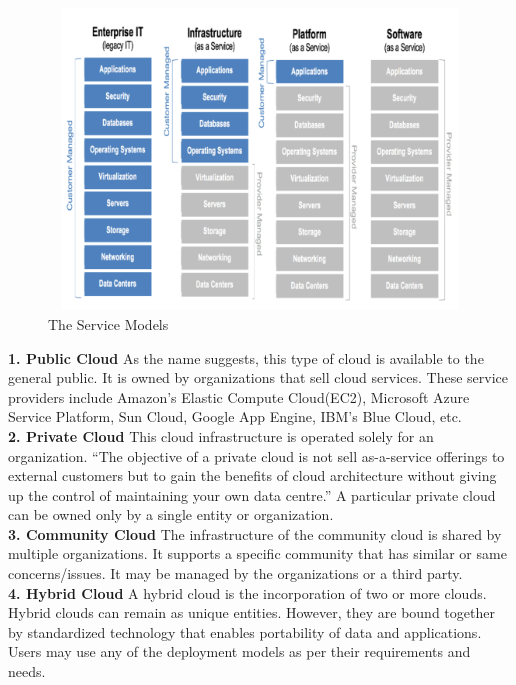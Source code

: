 \begin{figure}[htb]
\centering
\includegraphics[width=12cm,height=8cm]{5-contents/1-Introduction/images/service-model.png} %
\caption{The Service Models}
\label{fig:label} %
\end{figure}

\textbf{1. Public Cloud} {As the name suggests, this type of cloud is available to the general public. It is owned by organizations that sell cloud services. These service providers include Amazon’s Elastic Compute Cloud(EC2), Microsoft Azure Service Platform, Sun Cloud, Google App Engine, IBM’s Blue Cloud, etc.}\\
\textbf{2. Private Cloud} {This cloud infrastructure is operated solely for an organization. “The objective of a private cloud is not sell as-a-service offerings to external customers but to gain the benefits of cloud architecture without giving up the control of maintaining your own data centre.” A particular private cloud can be owned only by a single entity or organization.}\\
\textbf{3. Community Cloud} {The infrastructure of the community cloud is shared by multiple organizations. It supports a specific community that has similar or same concerns/issues. It may be managed by the organizations or a third party.}\\
\textbf{4. Hybrid Cloud} {A hybrid cloud is the incorporation of two or more clouds. Hybrid clouds can remain as unique entities. However, they are bound together by standardized technology that enables portability of data and applications.}
Users may use any of the deployment models as per their requirements and needs.


